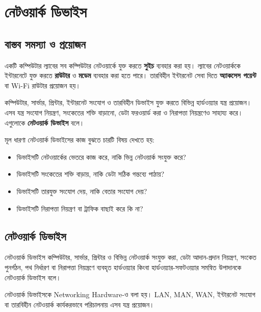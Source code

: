 \begingroup
\chTwoReadableTopicStyle
\section{নেটওয়ার্ক ডিভাইস}

\subsection{বাস্তব সমস্যা ও প্রয়োজন}

একটি কম্পিউটার ল্যাবের সব কম্পিউটার নেটওয়ার্কে যুক্ত করতে \textbf{সুইচ} ব্যবহার করা হয়। ল্যাবের নেটওয়ার্ককে ইন্টারনেটে যুক্ত করতে \textbf{রাউটার} ও \textbf{মডেম} ব্যবহার করা হতে পারে। তারবিহীন ইন্টারনেট সেবা দিতে \textbf{অ্যাকসেস পয়েন্ট} বা Wi-Fi রাউটার প্রয়োজন হয়।

কম্পিউটার, সার্ভার, প্রিন্টার, ইন্টারনেট সংযোগ ও তারবিহীন ডিভাইস যুক্ত করতে বিভিন্ন হার্ডওয়্যার যন্ত্র প্রয়োজন। এসব যন্ত্র সংযোগ নিয়ন্ত্রণ, সংকেতের শক্তি বাড়ানো, ডেটা ফরওয়ার্ড করা ও নিরাপত্তা নিয়ন্ত্রণেও সাহায্য করে। এগুলোকে \textbf{নেটওয়ার্ক ডিভাইস} বলে।

\begin{keypointbox}{মূল ধারণা}
নেটওয়ার্ক ডিভাইসের কাজ বুঝতে চারটি বিষয় দেখতে হয়:
\begin{itemize}
\item ডিভাইসটি নেটওয়ার্কের ভেতরে কাজ করে, নাকি ভিন্ন নেটওয়ার্ক সংযুক্ত করে?
\item ডিভাইসটি সংকেতের শক্তি বাড়ায়, নাকি ডেটা সঠিক গন্তব্যে পাঠায়?
\item ডিভাইসটি তারযুক্ত সংযোগ দেয়, নাকি বেতার সংযোগ দেয়?
\item ডিভাইসটি নিরাপত্তা নিয়ন্ত্রণ বা ট্রাফিক বাছাই করে কি না?
\end{itemize}
\end{keypointbox}

\subsection{নেটওয়ার্ক ডিভাইস}

\begin{definitionbox}{নেটওয়ার্ক ডিভাইস}
কম্পিউটার, সার্ভার, প্রিন্টার ও বিভিন্ন নেটওয়ার্ক সংযুক্ত করা, ডেটা আদান-প্রদান নিয়ন্ত্রণ, সংকেত পুনর্গঠন, পথ নির্ধারণ বা নিরাপত্তা নিয়ন্ত্রণে ব্যবহৃত হার্ডওয়্যার কিংবা হার্ডওয়্যার-সফটওয়্যার সমন্বিত উপাদানকে নেটওয়ার্ক ডিভাইস বলে।
\end{definitionbox}

নেটওয়ার্ক ডিভাইসকে Networking Hardware-ও বলা হয়। LAN, MAN, WAN, ইন্টারনেট সংযোগ বা তারবিহীন নেটওয়ার্ক কার্যকরভাবে পরিচালনায় এসব যন্ত্র প্রয়োজন।

